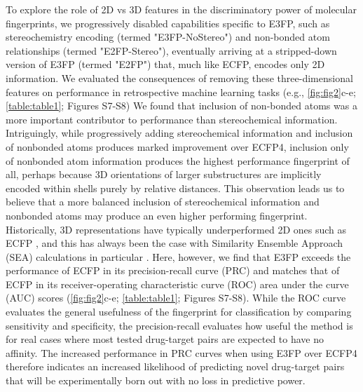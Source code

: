 \documentclass[../main.tex]{subfiles}
\begin{document}
\begin{refsection}
To explore the role of 2D vs 3D features in the discriminatory power of molecular fingerprints, we progressively disabled capabilities specific to E3FP, such as stereochemistry encoding (termed "E3FP-NoStereo") and non-bonded atom relationships (termed "E2FP-Stereo"), eventually arriving at a stripped-down version of E3FP (termed "E2FP") that, much like ECFP, encodes only 2D information.
We evaluated the consequences of removing these three-dimensional features on performance in retrospective machine learning tasks (e.g., \cref{fig:fig2}c-e; \cref{table:table1}; Figures S7-S8) We found that inclusion of non-bonded atoms was a more important contributor to performance than stereochemical information.
Intriguingly, while progressively adding stereochemical information and inclusion of nonbonded atoms produces marked improvement over ECFP4, inclusion only of nonbonded atom information produces the highest performance fingerprint of all, perhaps because 3D orientations of larger substructures are implicitly encoded within shells purely by relative distances.
This observation leads us to believe that a more balanced inclusion of stereochemical information and nonbonded atoms may produce an even higher performing fingerprint.
Historically, 3D representations have typically underperformed 2D ones such as ECFP  \cite{maggiora_2014}, and this has always been the case with Similarity Ensemble Approach (SEA) calculations in particular \cite{hert_2008}.
Here, however, we find that E3FP exceeds the performance of ECFP in its precision-recall curve (PRC) and matches that of ECFP in its receiver-operating characteristic curve (ROC) area under the curve (AUC) scores (\cref{fig:fig2}c-e; \cref{table:table1}; Figures S7-S8).
While the ROC curve evaluates the general usefulness of the fingerprint for classification by comparing sensitivity and specificity, the precision-recall evaluates how useful the method is for real cases where most tested drug-target pairs are expected to have no affinity.
The increased performance in PRC curves when using E3FP over ECFP4 therefore indicates an increased likelihood of predicting novel drug-target pairs that will be experimentally born out with no loss in predictive power.


\end{refsection}
\end{document}
